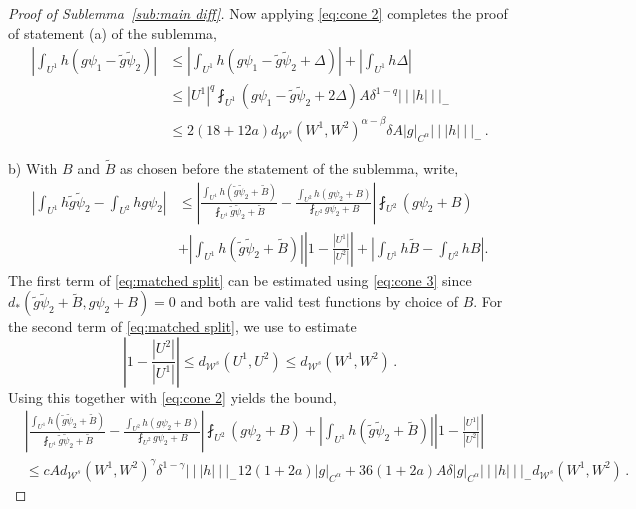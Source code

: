 \documentclass{amsart}
\numberwithin{equation}{section}
\newcommand\cW{{\mathcal W}}
\newcommand{\tB}{\tilde{B}}
\newcommand{\tg}{\tilde{g}}
\newcommand\tpsi{\tilde{\psi}}
\newcommand{\tri}{{|\:\!\!|\:\!\!|}}
\begin{document}
\begin{proof}[Proof of Sublemma~\ref{sub:main diff}]
Now applying \eqref{eq:cone 2} completes the proof of statement (a) of the sublemma,
\[
\begin{split}
\left| \int_{U^1} h (g \psi_1 - \tg \tpsi_2) \right|
& \le \left| \int_{U^1} h (g \psi_1 - \tg \tpsi_2 + \Delta) \right| + \left| \int_{U^1} h \Delta \right| \\
& \le |U^1|^q \fint_{U^1} (g \psi_1 - \tg \tpsi_2 + 2\Delta) A \delta^{1-q} \tri h \tri_- \\
& \le 2 (18 + 12a) d_{\cW^s}(W^1, W^2)^{\alpha - \beta} \delta A |g|_{C^\alpha} \tri h \tri_-\, .
 \end{split}
\]

\medskip
\noindent
b) With $B$ and $\tilde B$ as chosen before the statement of the sublemma, write,
\begin{equation}
\label{eq:matched split}
\begin{split}
 \left| \int_{U^1}\!\!\! h \tg \tpsi_2 - \int_{U^2}\!\!\!  h g \psi_2 \right| &
\le \left| \frac{\int_{U^1} h (\tg \tpsi_2 + \tB)}{\fint_{U^1} \tg \tpsi_2 + \tB} - \frac{ \int_{U^2} h(g \psi_2+B)}{\fint_{U^2} g\psi_2 +B} \right| \fint_{U^2}\!\! (g\psi_2 + B) \\
& + \left| \int_{U^1} h(\tg \tpsi_2 + \tB) \right| \left| 1 - \frac{|U^1|}{|U^2|} \right|
+ \left| \int_{U^1} h \tB - \int_{U^2} h B \right|.
\end{split}
\end{equation}
The first term of \eqref{eq:matched split} can be estimated using \eqref{eq:cone 3} since
$d_*(\tg \tpsi_2 + \tB, g \psi_2 + B) =0$ and both are valid test functions by choice of $B$.  For the second
term of \eqref{eq:matched split}, we use \cite[eq.~(5.24)]{DL22} to estimate
\begin{equation}
\label{eq:close piece}
\left| 1 - \frac{|U^2|}{|U^1|} \right| \le d_{\cW^s}(U^1, U^2) \le d_{\cW^s}(W^1, W^2) \, .
\end{equation}
Using this together with \eqref{eq:cone 2} yields the bound,
\[
\begin{split}
& \left| \frac{\int_{U^1} h (\tg \tpsi_2 + \tB)}{\fint_{U^1} \tg \tpsi_2 + \tB} - \frac{ \int_{U^2} h(g \psi_2+B)}{\fint_{U^2} g\psi_2 +B} \right| \fint_{U^2} (g\psi_2 + B) 
+ \left| \int_{U^1} h(\tg \tpsi_2 + \tB) \right| \left| 1 - \frac{|U^1|}{|U^2|} \right| \\
& \le cA d_{\cW^s}(W^1, W^2)^\gamma \delta^{1-\gamma} \tri h \tri_- 12 (1+2a) |g|_{C^\alpha}
+ 36(1+2a) A \delta |g|_{C^\alpha} \tri h \tri_- d_{\cW^s}(W^1, W^2) \, . 
\end{split}
\]
\end{proof}
\end{document}
